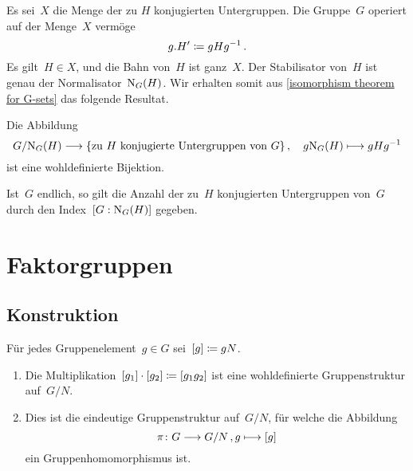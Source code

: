 \begin{corollary}
  
\end{corollary}

Es sei~$X$ die Menge der zu $H$ konjugierten Untergruppen.
Die Gruppe~$G$ operiert auf der Menge~$X$ vermöge
\[
  g.H' \coloneqq g H g^{-1} \,.
\]
Es gilt~$H \in X$, und die Bahn von~$H$ ist ganz~$X$.
Der Stabilisator von~$H$ ist genau der Normalisator~$\operatorname{N}_G(H)$.
Wir erhalten somit aus \cref{isomorphism theorem for G-sets} das folgende Resultat.

\begin{corollary}
  Die Abbildung
  \[
    G / {\normalizer_G(H)}
    \to
    \{
      \text{zu~$H$ konjugierte Untergruppen von~$G$}
    \} \,,
    \quad
    g {\normalizer_G(H)}
    \mapsto
    g H g^{-1}
  \]
  ist eine wohldefinierte Bijektion.
\end{corollary}

\begin{corollary}
  Ist~$G$ endlich, so gilt die Anzahl der zu~$H$ konjugierten Untergruppen von~$G$ durch den Index~$[G : \operatorname{N}_G(H)]$ gegeben.
\end{corollary}





\section{Faktorgruppen}



\subsection{Konstruktion}

\begin{proposition}
  \label{construction of quotient group}
  Für jedes Gruppenelement~$g \in G$ sei~$[g] \coloneqq gN$.
  \begin{enumerate}
    \item
      Die Multiplikation~$[g_1] \cdot [g_2] \coloneqq [g_1 g_2]$ ist eine wohldefinierte Gruppenstruktur auf~$G/N$.
    \item
      Dies ist die eindeutige Gruppenstruktur auf~$G/N$, für welche die Abbildung
      \[
        \pi
        \colon
        G \to G/N \,,
        g \mapsto \class{g}
      \] ein Gruppenhomomorphismus ist.
  \end{enumerate}
\end{proposition}


